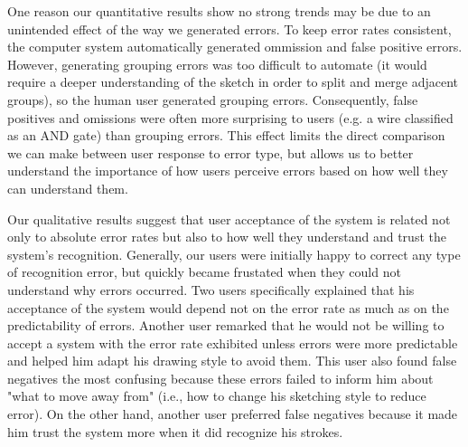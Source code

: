 \documentclass{egpubl}
\begin{document}
One reason our quantitative results show no strong trends may be due
to an unintended effect of the way we generated errors.  To keep error
rates consistent, the computer system automatically generated
ommission and false positive errors.  However, generating grouping
errors was too difficult to automate (it would require a deeper
understanding of the sketch in order to split and merge adjacent
groups), so the human user generated grouping errors.  Consequently,
false positives and omissions were often more surprising to users
(e.g. a wire classified as an AND gate) than grouping errors.  This
effect limits the direct comparison we can make between user response
to error type, but allows us to better understand the importance of
how users perceive errors based on how well they can understand them.

Our qualitative results suggest that user acceptance of the system is
related not only to absolute error rates but also to how well they
understand and trust the system's recognition.  Generally, our users
were initially happy to correct any type of recognition error, but
quickly became frustated when they could not understand why errors
occurred.  Two users specifically explained that his acceptance of the
system would depend not on the error rate as much as on the
predictability of errors.  Another user remarked that he would not be
willing to accept a system with the error rate exhibited unless errors
were more predictable and helped him adapt his drawing style to avoid
them.  This user also found false negatives the most confusing because
these errors failed to inform him about "what to move away from"
(i.e., how to change his sketching style to reduce error).  On the
other hand, another user preferred false negatives because it made him
trust the system more when it did recognize his strokes.
\end{document}
